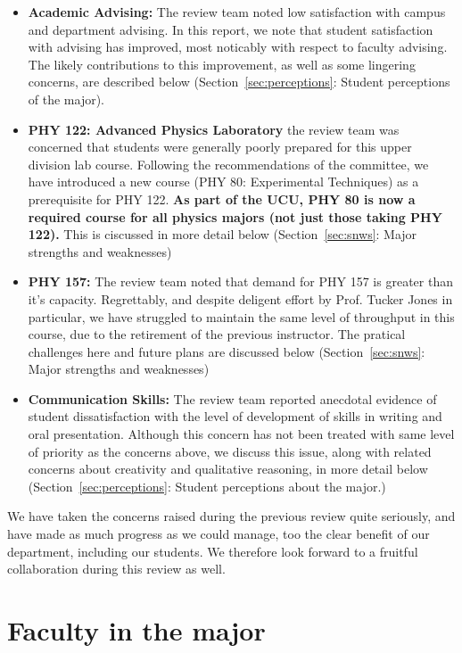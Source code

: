 \documentclass[12pt]{article}
\begin{document}
\begin{itemize}
\item {\bf Academic Advising:} The review team noted low satisfaction
  with campus and department advising.  In this report, we note that
  student satisfaction with advising has improved, most noticably with
  respect to faculty advising.  The likely contributions to this
  improvement, as well as some lingering concerns, are described below
  (Section~\ref{sec:perceptions}: Student perceptions of the major).

\item {\bf PHY 122: Advanced Physics Laboratory} the review team was
  concerned that students were generally poorly prepared for this
  upper division lab course.  Following the recommendations of the
  committee, we have introduced a new course (PHY 80: Experimental Techniques) as a prerequisite for PHY 122.  {\bf As part of the UCU, PHY 80 is now a required course for all physics majors (not just those taking PHY 122).}  This is ciscussed in more detail below (Section~\ref{sec:snws}: Major strengths and weaknesses)
  
\item {\bf PHY 157:}
  The review team noted that demand for PHY 157 is greater than it's
  capacity.  Regrettably, and despite deligent effort by Prof. Tucker Jones in particular, we have struggled to  maintain the same level of throughput in this course, due to the retirement of the previous instructor.  The pratical challenges here and future plans are discussed below (Section~\ref{sec:snws}: Major strengths and weaknesses)

\item {\bf Communication Skills:} The review team reported anecdotal
  evidence of student dissatisfaction with the level of development of
  skills in writing and oral presentation.  Although this concern has
  not been treated with same level of priority as the concerns above,
  we discuss this issue, along with related concerns about creativity
  and qualitative reasoning, in more detail below
  (Section~\ref{sec:perceptions}: Student perceptions about the
  major.)

\end{itemize}

We have taken the concerns raised during the previous review quite
seriously, and have made as much progress as we could manage, too the
clear benefit of our department, including our students.  We therefore
look forward to a fruitful collaboration during this review as well.


\section{Faculty in the major}
\label{sec:faculty}
\end{document}
